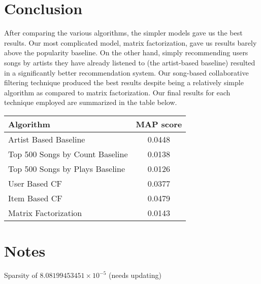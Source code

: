 \documentclass[12pt,preprint]{aastex}
\begin{document}



\section{Conclusion}
After comparing the various algorithms, the simpler models gave us the best results. Our most complicated model, matrix factorization, gave us results barely above the popularity baseline. On the other hand, simply recommending users songs by artists they have already listened to (the artist-based baseline) resulted in a significantly better recommendation system. Our song-based collaborative filtering technique produced the best results despite being a relatively simple algorithm as compared to matrix factorization. Our final results for each technique employed are summarized in the table below. 

\begin{table}[h]
\begin{center}
\begin{tabular}{lc}

\hline
\bf{Algorithm} &  \bf{MAP score}\\ \hline
Artist Based  Baseline  & 0.0448    \\ 
Top 500 Songs by Count  Baseline &  0.0138  \\ 
Top 500 Songs by Plays  Baseline &  0.0126  \\ 
User Based  CF  &  0.0377 \\ 
Item Based  CF  &  0.0479 \\ 
Matrix Factorization  &   0.0143  \\ 
\end{tabular}
\end{center}
\end{table}


\section{Notes}
Sparsity of $8.08199453451\times 10^{-5}$ (needs updating)

\end{document}
